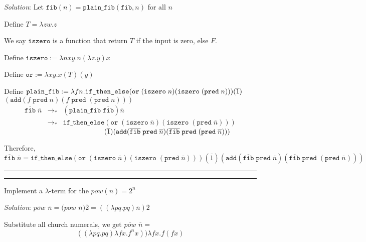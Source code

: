 \documentclass[a4paper, 11pt]{article}
\newcommand{\question}[2] {\vspace{.25in} \hrule\vspace{0.5em}
	\noindent{\bf #1: #2} \vspace{0.5em}
	\hrule \vspace{.10in}}
\newcommand\tab[1][1cm]{\hspace*{#1}}
\begin{document}
	{\em Solution}:
	Let $\texttt{fib}(n) = \texttt{plain\_fib}(\texttt{fib}, n)$ for all $n$
	
	Define $T = \lambda zw. z$
	
	We say $\texttt{iszero}$ is a function that return $T$ if the input is zero, else $F$.
	
	Define $\texttt{iszero} := \lambda nxy.n(\lambda z.y)x$
	
	Define $\texttt{or} := \lambda xy.x(T)(y)$
	
	Define $\texttt{plain\_fib} := \lambda fn.\texttt{if\_then\_else}
	(\texttt{or}\; (\texttt{iszero}\;n)(\texttt{iszero}\;(\texttt{pred}\;n)))
	(\overline{1})\\$
	\tab[3.5cm] $(\texttt{add} (f\;\texttt{pred}\; n) (f\;\texttt{pred}\;(\texttt{pred}\;n) ))
	$
	\begin{eqnarray}
	\overline{\texttt{fib} }\;\overline{n} &\rightarrow_*& (\texttt{plain\_fib} \; \overline{\texttt{fib}}) \overline{n}\\
	&\rightarrow_*& \texttt{if\_then\_else}
	(\texttt{or}\; (\texttt{iszero}\;\overline{n})(\texttt{iszero}\;(\texttt{pred}\;\overline{n})))
	\end{eqnarray}
	$\tab[5cm] (\overline{1})(\texttt{add} (\overline{\texttt{fib} }\;\texttt{pred}\; \overline{n}) (\overline{\texttt{fib} }\;\texttt{pred}\;(\texttt{pred}\;\overline{n}) ))$
	
	Therefore,
	$$\overline{\texttt{fib} }\;\overline{n} = \texttt{if\_then\_else}
	(\texttt{or}\; (\texttt{iszero}\;\overline{n})(\texttt{iszero}\;(\texttt{pred}\;\overline{n})))
 (\overline{1})(\texttt{add} (\overline{\texttt{fib} }\;\texttt{pred}\; \overline{n}) (\overline{\texttt{fib} }\;\texttt{pred}\;(\texttt{pred}\;\overline{n}) ))$$
	\question{9}{Power Of 2}

	Implement a  $ \lambda $-term for the $pow(n) = 2^n$
	
	{\em Solution}: $\overline{pow}$ $\overline{n} 
	=  (pow$ $\overline{n}) \overline{2} 
	=  ((\lambda p q . p q) \overline{n}) \overline{2} 
	$
	
	Substitute all church numerals, we get  $\overline{pow}$ $\overline{n} =$
	$$  ((\lambda p q . p q) \lambda f x. f^n x)) \lambda f x. f ( f x) $$
	
	
\end{document}
